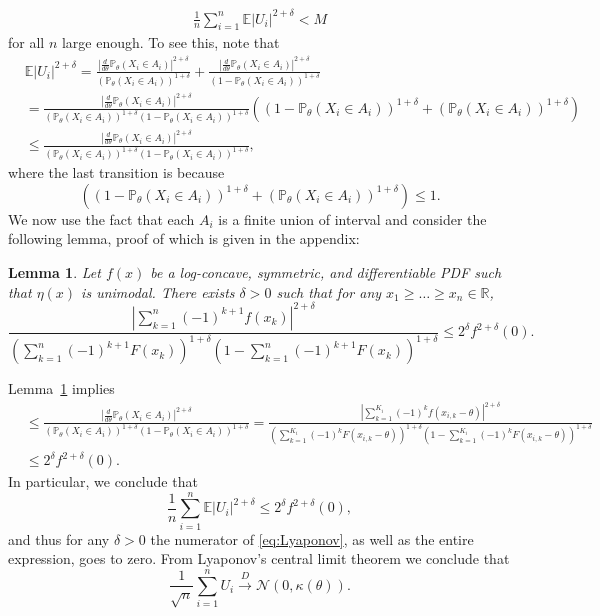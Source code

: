 \documentclass[letterpaper, 11pt]{IEEEtran}      %
\newtheorem{lem}[thm]{\bf {Lemma}}
\newcommand{\Prob}{\mathbb{P} }
\begin{document}
\begin{align}
\frac{1}{n} \sum_{i=1}^n \mathbb E  |U_i|^{2+\delta}  < M \label{eq:Lyaponov_num}
\end{align} 
for all $n$ large enough. To see this, note that
\begin{align*}
& \mathbb E |U_i|^{2+\delta} = 
 \frac{ \left| \frac{d}{d\theta} \Prob_{\theta}(X_i \in A_i) \right|^{2+\delta}} {(\Prob_{\theta}(X_i \in A_i))^{1+\delta}} +  
  \frac{ \left|\frac{d}{d\theta} \Prob_{\theta}(X_i \in A_i) \right|^{2+\delta}} {(1-\Prob_{\theta}(X_i \in A_i))^{1+\delta}}  \\
  &  = \frac{\left| \frac{d}{d\theta} \Prob_{\theta}(X_i \in A_i) \right|^{2+\delta} }
  { (\Prob_{\theta}(X_i \in A_i))^{1+\delta} (1-\Prob_{\theta}(X_i \in A_i))^{1+\delta} } 
  \left( (1-\Prob_{\theta}(X_i \in A_i))^{1+\delta} + (\Prob_{\theta}(X_i \in A_i))^{1+\delta}   \right) \\
  &  \leq \frac{\left| \frac{d}{d\theta} \Prob_{\theta}(X_i \in A_i) \right|^{2+\delta} }
  { (\Prob_{\theta}(X_i \in A_i))^{1+\delta} (1-\Prob_{\theta}(X_i \in A_i))^{1+\delta}}, 
\end{align*}
where the last transition is because 
\[
 \left( (1-\Prob_{\theta}(X_i \in A_i))^{1+\delta} + (\Prob_{\theta}(X_i \in A_i))^{1+\delta}   \right) \leq 1. 
\]
We now use the fact that each $A_i$ is a finite union of interval and consider the following lemma, proof of which is given in the appendix:
\begin{lem} \label{lem:bound_intervals_delta}
Let $f(x)$ be a log-concave, symmetric, and differentiable PDF such that $\eta(x)$ is unimodal.  There exists $\delta>0$ such that for any $x_1 \geq \ldots \geq x_n \in \mathbb R$, 
\begin{equation}
\frac{ \left| \sum_{k=1}^n (-1)^{k+1} f(x_k) \right|^{2+\delta} }
{\left( \sum_{k=1}^n (-1)^{k+1} F(x_k) \right)^{1+\delta} \left(1- \sum_{k=1}^n (-1)^{k+1} F(x_k) \right)^{1+\delta} } 
\leq  2^\delta f^{2+\delta}(0). 
\label{eq:lem_bound_intervals_delta}
\end{equation}
\end{lem}

Lemma~\ref{lem:bound_intervals_delta} implies 
\begin{align*}
  &  \leq \frac{\left| \frac{d}{d\theta} \Prob_{\theta}(X_i \in A_i) \right|^{2+\delta} }
  { (\Prob_{\theta}(X_i \in A_i))^{1+\delta} (1-\Prob_{\theta}(X_i \in A_i))^{1+\delta}} = \frac{\left| \sum_{k=1}^{K_i} (-1)^k f(x_{i,k}-\theta) \right|^{2+\delta} }
  { \left( \sum_{k=1}^{K_i} (-1)^k F(x_{i,k}-\theta) \right)^{1+\delta} \left( 1 - \sum_{k=1}^{K_i} (-1)^k F(x_{i,k}-\theta) \right)^{1+\delta}} \\
  & \leq 2^\delta f^{2+\delta}(0). 
\end{align*}
In particular, we conclude that 
\[
\frac{1}{n} \sum_{i=1}^n \mathbb E |U_i|^{2+\delta} \leq 2^\delta f^{2+\delta}(0), 
\]
and thus for any $\delta>0$ the numerator of \eqref{eq:Lyaponov}, as well as the entire expression, goes to zero. From Lyaponov's central limit theorem we conclude that 
\[
\frac{1}{\sqrt{n}} \sum_{i=1}^n U_i \overset{D}{\rightarrow} \mathcal N\left(0,\kappa(\theta) \right). 
\]
\end{document}
